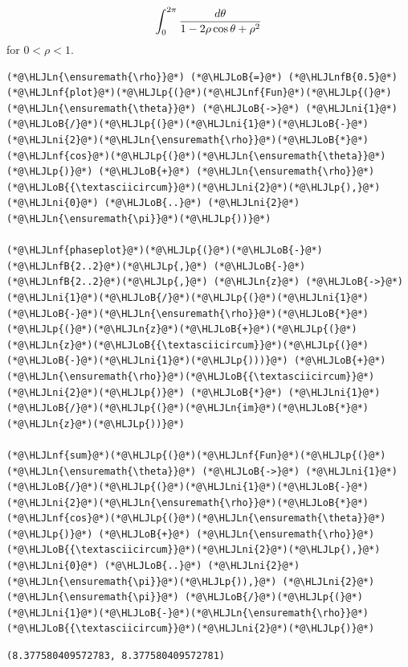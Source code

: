 \documentclass[12pt,a4paper]{article}
\newcommand{\HLJLn}[1]{#1}
\newcommand{\HLJLnf}[1]{\textcolor[RGB]{66,102,213}{#1}}
\newcommand{\HLJLnfB}[1]{\textcolor[RGB]{59,151,46}{#1}}
\newcommand{\HLJLni}[1]{\textcolor[RGB]{59,151,46}{#1}}
\newcommand{\HLJLoB}[1]{\textcolor[RGB]{102,102,102}{\textbf{#1}}}
\newcommand{\HLJLp}[1]{#1}
\begin{document}
\[
\int_0^{2\pi} {d \theta \over 1 - 2\rho \cos \theta + \rho^2}
\]
for $0 < \rho < 1$.


\begin{lstlisting}
(*@\HLJLn{\ensuremath{\rho}}@*) (*@\HLJLoB{=}@*) (*@\HLJLnfB{0.5}@*)
(*@\HLJLnf{plot}@*)(*@\HLJLp{(}@*)(*@\HLJLnf{Fun}@*)(*@\HLJLp{(}@*)(*@\HLJLn{\ensuremath{\theta}}@*) (*@\HLJLoB{->}@*) (*@\HLJLni{1}@*)(*@\HLJLoB{/}@*)(*@\HLJLp{(}@*)(*@\HLJLni{1}@*)(*@\HLJLoB{-}@*)(*@\HLJLni{2}@*)(*@\HLJLn{\ensuremath{\rho}}@*)(*@\HLJLoB{*}@*)(*@\HLJLnf{cos}@*)(*@\HLJLp{(}@*)(*@\HLJLn{\ensuremath{\theta}}@*)(*@\HLJLp{)}@*) (*@\HLJLoB{+}@*) (*@\HLJLn{\ensuremath{\rho}}@*)(*@\HLJLoB{{\textasciicircum}}@*)(*@\HLJLni{2}@*)(*@\HLJLp{),}@*) (*@\HLJLni{0}@*) (*@\HLJLoB{..}@*) (*@\HLJLni{2}@*)(*@\HLJLn{\ensuremath{\pi}}@*)(*@\HLJLp{))}@*)

(*@\HLJLnf{phaseplot}@*)(*@\HLJLp{(}@*)(*@\HLJLoB{-}@*)(*@\HLJLnfB{2..2}@*)(*@\HLJLp{,}@*) (*@\HLJLoB{-}@*)(*@\HLJLnfB{2..2}@*)(*@\HLJLp{,}@*) (*@\HLJLn{z}@*) (*@\HLJLoB{->}@*)  (*@\HLJLni{1}@*)(*@\HLJLoB{/}@*)(*@\HLJLp{(}@*)(*@\HLJLni{1}@*)(*@\HLJLoB{-}@*)(*@\HLJLn{\ensuremath{\rho}}@*)(*@\HLJLoB{*}@*)(*@\HLJLp{(}@*)(*@\HLJLn{z}@*)(*@\HLJLoB{+}@*)(*@\HLJLp{(}@*)(*@\HLJLn{z}@*)(*@\HLJLoB{{\textasciicircum}}@*)(*@\HLJLp{(}@*)(*@\HLJLoB{-}@*)(*@\HLJLni{1}@*)(*@\HLJLp{)))}@*) (*@\HLJLoB{+}@*) (*@\HLJLn{\ensuremath{\rho}}@*)(*@\HLJLoB{{\textasciicircum}}@*)(*@\HLJLni{2}@*)(*@\HLJLp{)}@*) (*@\HLJLoB{*}@*) (*@\HLJLni{1}@*)(*@\HLJLoB{/}@*)(*@\HLJLp{(}@*)(*@\HLJLn{im}@*)(*@\HLJLoB{*}@*)(*@\HLJLn{z}@*)(*@\HLJLp{))}@*)

(*@\HLJLnf{sum}@*)(*@\HLJLp{(}@*)(*@\HLJLnf{Fun}@*)(*@\HLJLp{(}@*)(*@\HLJLn{\ensuremath{\theta}}@*) (*@\HLJLoB{->}@*) (*@\HLJLni{1}@*)(*@\HLJLoB{/}@*)(*@\HLJLp{(}@*)(*@\HLJLni{1}@*)(*@\HLJLoB{-}@*)(*@\HLJLni{2}@*)(*@\HLJLn{\ensuremath{\rho}}@*)(*@\HLJLoB{*}@*)(*@\HLJLnf{cos}@*)(*@\HLJLp{(}@*)(*@\HLJLn{\ensuremath{\theta}}@*)(*@\HLJLp{)}@*) (*@\HLJLoB{+}@*) (*@\HLJLn{\ensuremath{\rho}}@*)(*@\HLJLoB{{\textasciicircum}}@*)(*@\HLJLni{2}@*)(*@\HLJLp{),}@*) (*@\HLJLni{0}@*) (*@\HLJLoB{..}@*) (*@\HLJLni{2}@*)(*@\HLJLn{\ensuremath{\pi}}@*)(*@\HLJLp{)),}@*) (*@\HLJLni{2}@*)(*@\HLJLn{\ensuremath{\pi}}@*) (*@\HLJLoB{/}@*)(*@\HLJLp{(}@*)(*@\HLJLni{1}@*)(*@\HLJLoB{-}@*)(*@\HLJLn{\ensuremath{\rho}}@*)(*@\HLJLoB{{\textasciicircum}}@*)(*@\HLJLni{2}@*)(*@\HLJLp{)}@*)
\end{lstlisting}

\begin{lstlisting}
(8.377580409572783, 8.377580409572781)
\end{lstlisting}
\end{document}
